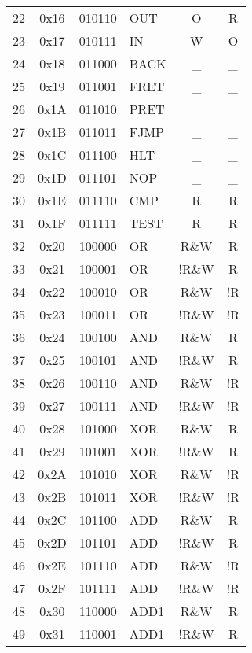 \documentclass[oneside, a4paper]{memoir}
\begin{document}
\begin{center}
\begin{longtable}{ccclcc}
22 & 0x16 & 010110 & OUT             & O     & R   \\
23 & 0x17 & 010111 & IN              & W     & O   \\
24 & 0x18 & 011000 & BACK            & \_    & \_  \\
25 & 0x19 & 011001 & FRET            & \_    & \_  \\
26 & 0x1A & 011010 & PRET            & \_    & \_  \\
27 & 0x1B & 011011 & FJMP            & \_    & \_  \\
28 & 0x1C & 011100 & HLT             & \_    & \_  \\
29 & 0x1D & 011101 & NOP             & \_    & \_  \\
30 & 0x1E & 011110 & CMP             & R     & R   \\
31 & 0x1F & 011111 & TEST            & R     & R   \\
32 & 0x20 & 100000 & OR              & R\&W  & R   \\
33 & 0x21 & 100001 & OR              & !R\&W & R   \\
34 & 0x22 & 100010 & OR              & R\&W  & !R  \\
35 & 0x23 & 100011 & OR              & !R\&W & !R  \\
36 & 0x24 & 100100 & AND             & R\&W  & R   \\
37 & 0x25 & 100101 & AND             & !R\&W & R   \\
38 & 0x26 & 100110 & AND             & R\&W  & !R  \\
39 & 0x27 & 100111 & AND             & !R\&W & !R  \\
40 & 0x28 & 101000 & XOR             & R\&W  & R   \\
41 & 0x29 & 101001 & XOR             & !R\&W & R   \\
42 & 0x2A & 101010 & XOR             & R\&W  & !R  \\
43 & 0x2B & 101011 & XOR             & !R\&W & !R  \\
44 & 0x2C & 101100 & ADD             & R\&W  & R   \\
45 & 0x2D & 101101 & ADD             & !R\&W & R   \\
46 & 0x2E & 101110 & ADD             & R\&W  & !R  \\
47 & 0x2F & 101111 & ADD             & !R\&W & !R  \\
48 & 0x30 & 110000 & ADD1            & R\&W  & R   \\
49 & 0x31 & 110001 & ADD1            & !R\&W & R   \\

\end{longtable}
\end{center}
\end{document}
